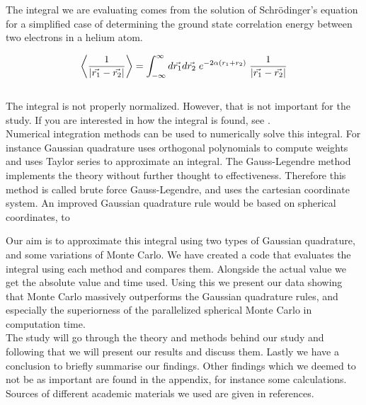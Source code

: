 \documentclass{article}
\begin{document}
The integral we are evaluating comes from the solution of Schrödinger's equation for a simplified case of determining the ground state correlation energy between two electrons in a helium atom.

\begin{equation} \label{eq:integral}
    \left\langle \frac{1}{| \vec{r_1} - \vec{r_2} |} \right\rangle = \int_{-\infty} ^\infty d \vec{r_1} d \vec{r_2} \hspace{1mm} e^{- 2 \alpha (r_1 + r_2)} \hspace{1mm} \frac{1}{| \vec{r_1} - \vec{r_2} |}
\end{equation} \\

The integral is not properly normalized. However, that is not important for the study. If you are interested in how the integral is found, see \cite{task}.\\

Numerical integration methods can be used to numerically solve this integral. For instance Gaussian quadrature uses orthogonal polynomials to compute weights and uses Taylor series to approximate an integral. The Gauss-Legendre method implements the theory without further thought to effectiveness. Therefore this method is called brute force Gauss-Legendre, and uses the cartesian coordinate system. An improved Gaussian quadrature rule would be based on spherical coordinates, to

Our aim is to approximate this integral using two types of Gaussian quadrature, and some variations of Monte Carlo. We have created a code that evaluates the integral using each method and compares them. Alongside the actual value we get the absolute value and time used. Using this we present our data showing that Monte Carlo massively outperforms the Gaussian quadrature rules, and especially the superiorness of the parallelized spherical Monte Carlo in computation time. \\

The study will go through the theory and methods behind our study and following that we will present our results and discuss them. Lastly we have a conclusion to briefly summarise our findings. Other findings which we deemed to not be as important are found in the appendix, for instance some calculations. Sources of different academic materials we used are given in references. \\


\vspace{1cm}
\end{document}
